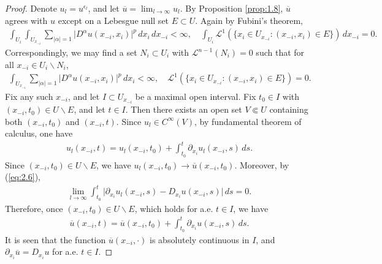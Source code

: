 \documentclass{article}
\numberwithin{equation}{section}
\newcommand{\ol}{\overline}
\theoremstyle{plain}
\theoremstyle{definition}
\begin{document}
\begin{proof}
Denote $u_l=u^{\epsilon_l}$, and let $\ol{u}=\lim_{l\to\infty}u_l$. By Proposition \ref{prop:1.8}, $\ol{u}$ agrees with $u$ except on a Lebesgue null set $E\subset U$. Again by Fubini's theorem,
\begin{align*}
	\int_{U_i}\int_{U_{x_{-i}}}\sum_{\vert\alpha\vert=1}\vert D^\alpha u(x_{-i},x_i)\vert^p\,dx_i\,dx_{-i}<\infty,\quad\int_{U_i}\mathcal{L}^1(\{x_i\in U_{x_{-i}}:(x_{-i},x_i)\in E\})\,dx_{-i}=0.
\end{align*}
Correspondingly, we may find a set $N_i\subset U_i$ with $\mathcal{L}^{n-1}(N_i)=0$ such that for all $x_{-i}\in U_i\backslash N_i$,
\begin{align*}
	\int_{U_{x_{-i}}}\sum_{\vert\alpha\vert=1}\vert D^\alpha u(x_{-i},x_i)\vert^p\,dx_i<\infty,\quad \mathcal{L}^1(\{x_i\in U_{x_{-i}}:(x_{-i},x_i)\in E\})=0.
\end{align*}
Fix any such $x_{-i}$, and let $I\subset U_{x_{-i}}$ be a maximal open interval. Fix $t_0\in I$ with $(x_{-i},t_0)\in U\backslash E$, and let $t\in I$. Then there exists an open set $V\Subset U$ containing both $(x_{-i},t_0)$ and $(x_{-i},t)$. Since $u_l\in C^\infty(V)$, by fundamental theorem of calculus, one have
\begin{align*}
	u_l(x_{-i},t)=u_l(x_{-i},t_0)+\int_{t_0}^t\partial_{x_i}u_l(x_{-i},s)\,ds.
\end{align*}
Since $(x_{-i},t_0)\in U\backslash E$, we have $u_l(x_{-i},t_0)\to\ol{u}(x_{-i},t_0)$. Moreover, by (\ref{eq:2.6}),
\begin{align*}
	\lim_{l\to\infty}\int_{t_0}^t\vert\partial_{x_i}u_l(x_{-i},s)-D_{x_i}u(x_{-i},s)\vert\,ds=0.
\end{align*}
Therefore, once $(x_{-i},t_0)\in U\backslash E$, which holds for a.e. $t\in I$, we have
\begin{align*}
	\ol{u}(x_{-i},t)=\ol{u}(x_{-i},t_0)+\int_{t_0}^t\partial_{x_i}u(x_{-i},s)\,ds.
\end{align*}
It is seen that the function $\ol{u}(x_{-i},\cdot)$ is absolutely continuous in $I$, and $\partial_{x_i}\ol{u}=D_{x_i}u$ for a.e. $t\in I$.\vspace{0.2cm}


\end{proof}
\end{document}
